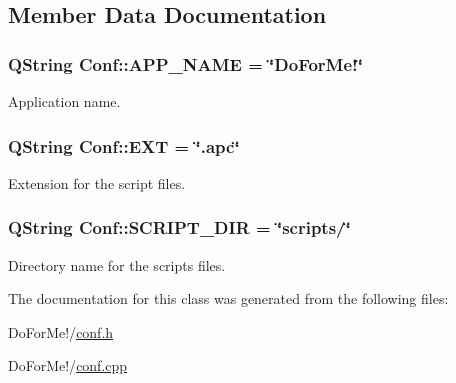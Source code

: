 \subsection{Member Data Documentation}
\hypertarget{struct_conf_add8ab284bf2e7a0b2667cfa921d23dad}{
\subsubsection[{A\-P\-P\-\_\-\-N\-A\-M\-E}]{\setlength{\rightskip}{0pt plus 5cm}Q\-String Conf\-::\-A\-P\-P\-\_\-\-N\-A\-M\-E = \char`\"{}Do\-For\-Me!\char`\"{}\hspace{0.3cm}{\ttfamily [static]}}}\label{struct_conf_add8ab284bf2e7a0b2667cfa921d23dad}


Application name. 

\hypertarget{struct_conf_ab3739fc216b9a13237a8e5876ff54c90}{
\subsubsection[{E\-X\-T}]{\setlength{\rightskip}{0pt plus 5cm}Q\-String Conf\-::\-E\-X\-T = \char`\"{}.apc\char`\"{}\hspace{0.3cm}{\ttfamily [static]}}}\label{struct_conf_ab3739fc216b9a13237a8e5876ff54c90}


Extension for the script files. 

\hypertarget{struct_conf_a612762032000af6687da2f749cb24a5a}{
\subsubsection[{S\-C\-R\-I\-P\-T\-\_\-\-D\-I\-R}]{\setlength{\rightskip}{0pt plus 5cm}Q\-String Conf\-::\-S\-C\-R\-I\-P\-T\-\_\-\-D\-I\-R = \char`\"{}scripts/\char`\"{}\hspace{0.3cm}{\ttfamily [static]}}}\label{struct_conf_a612762032000af6687da2f749cb24a5a}


Directory name for the scripts files. 



The documentation for this class was generated from the following files\-:\begin{DoxyCompactItemize}
\item 
Do\-For\-Me!/\hyperlink{conf_8h}{conf.\-h}\item 
Do\-For\-Me!/\hyperlink{conf_8cpp}{conf.\-cpp}\end{DoxyCompactItemize}

